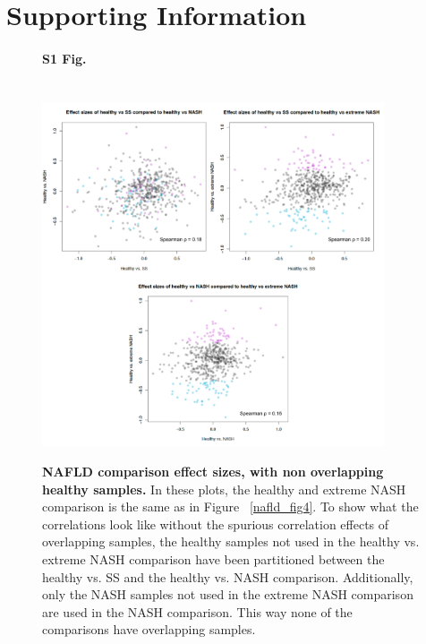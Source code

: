 \section*{{Supporting Information}}

\begin{figure}[h]
\paragraph*{S1 Fig.}{\mbox{}}\\
\includegraphics[width=0.9\textwidth]{nafld_16s_effect_sizes_partitioned_healthy.png}
\caption[NAFLD comparison effect sizes, with non overlapping healthy samples.]{{\bf {NAFLD comparison effect sizes, with non overlapping healthy samples.}} In these plots, the healthy and extreme NASH comparison is the same as in Figure ~\ref{nafld_fig4}. To show what the correlations look like without the spurious correlation effects of overlapping samples, the healthy samples not used in the healthy vs. extreme NASH comparison have been partitioned between the healthy vs. SS and the healthy vs. NASH comparison. Additionally, only the NASH samples not used in the extreme NASH comparison are used in the NASH comparison. This way none of the comparisons have overlapping samples.}
\label{nafld_non_overlapping_16s_effect}
\end{figure}
